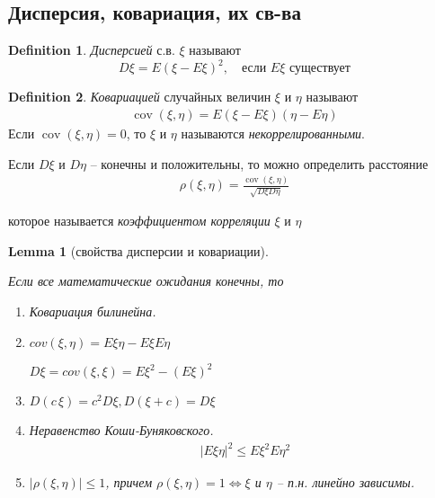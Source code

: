 \documentclass[a4paper]{article}
\theoremstyle{plain}
\newtheorem{lem}{Lemma}
\theoremstyle{remark}
\theoremstyle{definition}
\newtheorem{definition}{Definition}
\DeclareMathOperator{\cov}{cov}
\renewcommand{\leq}{\leqslant}
\begin{document}
\subsection{Дисперсия, ковариация, их св-ва}

\begin{definition}
  \emph{Дисперсией} с.в. $\xi$ называют
  \begin{equation*}
    D\xi = E(\xi - E\xi)^2, \quad \text{если $E\xi$ существует}
  \end{equation*}
\end{definition}

\begin{definition}
  \emph{Ковариацией} случайных величин $\xi$ и $\eta$ называют
  \begin{align*}
    \cov(\xi, \eta) = E(\xi - E\xi) (\eta - E\eta)
  \end{align*}
  Если $\cov(\xi, \eta) = 0$, то $\xi$ и $\eta$ называются \emph{некоррелированными}.
\end{definition}

Если $D\xi$ и $D\eta$ -- конечны и положительны, то можно определить расстояние
\begin{align*}
  \rho(\xi, \eta) = \frac{\cov(\xi, \eta)}{\sqrt{D \xi D \eta}}
\end{align*}

которое называется \emph{коэффициентом корреляции} $\xi$ и $\eta$

\begin{lem}[свойства дисперсии и ковариации]~

  Если все математические ожидания конечны, то 
  \begin{enumerate}
    \item 
      Ковариация билинейна.

    \item 
      $cov(\xi, \eta) = E \xi \eta - E\xi E\eta$

      $D\xi = cov(\xi, \xi) = E\xi^2 - (E \xi)^2$

    \item 
      $D(c\, \xi) = c^2 D \xi, D(\xi + c) = D \xi$

    \item 
      Неравенство Коши-Буняковского.
      \begin{align*}
        |E\xi \eta|^2 \leq E\xi^2 E\eta^2
      \end{align*}

    \item 
      $|\rho(\xi, \eta)| \leq 1$, 
      причем $\rho(\xi, \eta) = 1 \iff \xi$ и $\eta$ -- п.н. линейно зависимы.
  \end{enumerate}

\end{lem}
\end{document}
